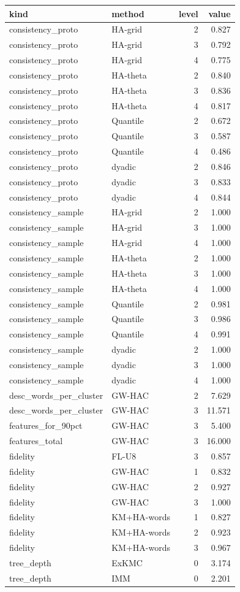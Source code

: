 \begin{tabular}{llrr}
\toprule
kind & method & level & value \\
\midrule
consistency_proto & HA-grid & 2 & 0.827 \\
consistency_proto & HA-grid & 3 & 0.792 \\
consistency_proto & HA-grid & 4 & 0.775 \\
consistency_proto & HA-theta & 2 & 0.840 \\
consistency_proto & HA-theta & 3 & 0.836 \\
consistency_proto & HA-theta & 4 & 0.817 \\
consistency_proto & Quantile & 2 & 0.672 \\
consistency_proto & Quantile & 3 & 0.587 \\
consistency_proto & Quantile & 4 & 0.486 \\
consistency_proto & dyadic & 2 & 0.846 \\
consistency_proto & dyadic & 3 & 0.833 \\
consistency_proto & dyadic & 4 & 0.844 \\
consistency_sample & HA-grid & 2 & 1.000 \\
consistency_sample & HA-grid & 3 & 1.000 \\
consistency_sample & HA-grid & 4 & 1.000 \\
consistency_sample & HA-theta & 2 & 1.000 \\
consistency_sample & HA-theta & 3 & 1.000 \\
consistency_sample & HA-theta & 4 & 1.000 \\
consistency_sample & Quantile & 2 & 0.981 \\
consistency_sample & Quantile & 3 & 0.986 \\
consistency_sample & Quantile & 4 & 0.991 \\
consistency_sample & dyadic & 2 & 1.000 \\
consistency_sample & dyadic & 3 & 1.000 \\
consistency_sample & dyadic & 4 & 1.000 \\
desc_words_per_cluster & GW-HAC & 2 & 7.629 \\
desc_words_per_cluster & GW-HAC & 3 & 11.571 \\
features_for_90pct & GW-HAC & 3 & 5.400 \\
features_total & GW-HAC & 3 & 16.000 \\
fidelity & FL-U8 & 3 & 0.857 \\
fidelity & GW-HAC & 1 & 0.832 \\
fidelity & GW-HAC & 2 & 0.927 \\
fidelity & GW-HAC & 3 & 1.000 \\
fidelity & KM+HA-words & 1 & 0.827 \\
fidelity & KM+HA-words & 2 & 0.923 \\
fidelity & KM+HA-words & 3 & 0.967 \\
tree_depth & ExKMC & 0 & 3.174 \\
tree_depth & IMM & 0 & 2.201 \\
\bottomrule
\end{tabular}
